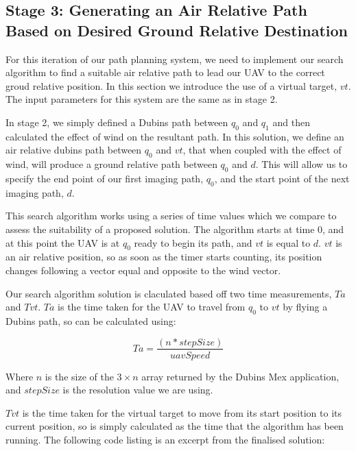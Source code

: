 \subsection{Stage 3: Generating an Air Relative Path Based on Desired Ground Relative Destination}
\label{task1:implementation:stage3}

For this iteration of our path planning system, we need to implement our search algorithm to find a suitable air relative path to lead our UAV to the correct groud relative position. In this section we introduce the use of a virtual target, $vt$. The input parameters for this system are the same as in stage 2. 

In stage 2, we simply defined a Dubins path between $q_0$ and $q_1$ and then calculated the effect of wind on the resultant path. In this solution, we define an air relative dubins path between $q_0$ and $vt$, that when coupled with the effect of wind, will produce a ground relative path between $q_0$ and $d$. This will allow us to specify the end point of our first imaging path, $q_0$, and the start point of the next imaging path, $d$. 

This search algorithm works using a series of time values which we compare to assess the suitability of a proposed solution. The algorithm starts at time 0, and at this point the UAV is at $q_0$ ready to begin its path, and $vt$ is equal to $d$. $vt$ is an air relative position, so as soon as the timer starts counting, its position changes following a vector equal and opposite to the wind vector. 

Our search algorithm solution is claculated based off two time measurements, $Ta$ and $Tvt$. $Ta$ is the time taken for the UAV to travel from $q_0$ to $vt$ by flying a Dubins path, so can be calculated using:

\begin{equation}
	Ta = \frac{(n*stepSize)}{uavSpeed}
\end{equation}

Where $n$ is the size of the  $3 \times n$ array returned by the Dubins Mex application, and $stepSize$ is the resolution value we are using.

$Tvt$ is the time taken for the virtual target to move from its start position to its current position, so is simply calculated as the time that the algorithm has been running. The following code listing is an excerpt from the finalised solution:

